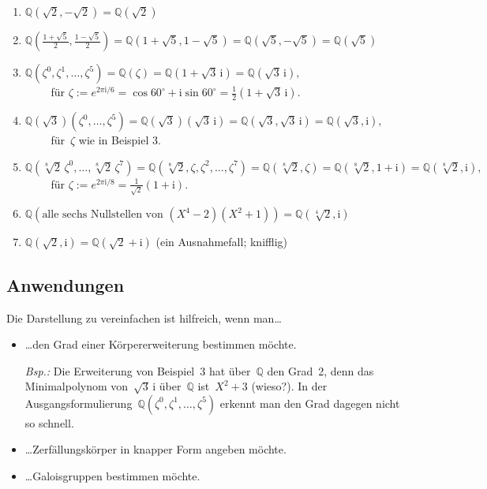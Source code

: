 \documentclass[12pt,a4paper,ngerman]{scrartcl}
\newcommand{\Q}{\mathbb{Q}}
\newcommand{\I}{\mathrm{i}}
\theoremstyle{definition}
\theoremstyle{plain}
\theoremstyle{remark}
\begin{document}
\begin{enumerate}
\item $\Q(\sqrt{2}, {-}\sqrt{2}) = \Q(\sqrt{2})$
\item $\Q(\frac{1 + \sqrt{5}}{2}, \frac{1 - \sqrt{5}}{2}) = \Q(1+\sqrt{5},
1-\sqrt{5}) = \Q(\sqrt{5},-\sqrt{5}) = \Q(\sqrt{5})$
\item $\Q(\zeta^0,\zeta^1,\ldots,\zeta^5) = \Q(\zeta) = \Q(1
+ \sqrt{3}\,\I) = \Q(\sqrt{3}\,\I),$ \\
${\qquad}$ für $\zeta := e^{2 \pi \I/6} = \cos 60^\circ + \I \sin 60^\circ =
\frac{1}{2}(1 + \sqrt{3}\,\I)$.
\item $\Q(\sqrt{3})(\zeta^0,\ldots,\zeta^5) = \Q(\sqrt{3})(\sqrt{3}\,\I) =
\Q(\sqrt{3},\sqrt{3}\,\I) = \Q(\sqrt{3},\I),$ \\
${\qquad}$ für~$\zeta$ wie in Beispiel 3.
\item
$\Q(\sqrt[8]{2}\,\zeta^0, \ldots, \sqrt[8]{2}\,\zeta^7) = \Q(\sqrt[8]{2},
\zeta, \zeta^2, \ldots, \zeta^7) = \Q(\sqrt[8]{2}, \zeta) = \Q(\sqrt[8]{2}, 1 + \I) = \Q(\sqrt[8]{2},
\I),$ \\
${\qquad}$ für $\zeta := e^{2 \pi \I/8} = \frac{1}{\sqrt{2}}(1 + \I)$.
\item $\Q(\text{alle sechs Nullstellen von~$(X^4 - 2) (X^2 + 1)$}) =
\Q(\sqrt[4]{2}, \I)$
\item $\Q(\sqrt{2}, \I) = \Q(\sqrt{2} + \I)$ (ein Ausnahmefall; knifflig)
\end{enumerate}

\subsection*{Anwendungen}

Die Darstellung zu vereinfachen ist hilfreich, wenn man\ldots
\begin{itemize}
\item \ldots den Grad einer Körpererweiterung bestimmen
möchte.

\emph{Bsp.:} Die Erweiterung von Beispiel~3 hat über~$\Q$ den Grad~2, denn das
Minimalpolynom von~$\sqrt{3}\,\I$ über~$\Q$ ist~$X^2 + 3$ (wieso?). In der
Ausgangsformulierung~$\Q(\zeta^0,\zeta^1,\ldots,\zeta^5)$ erkennt man den Grad
dagegen nicht so schnell.
\item \ldots Zerfällungskörper in knapper Form angeben möchte.
\item \ldots Galoisgruppen bestimmen möchte.
\end{itemize}
\end{document}
